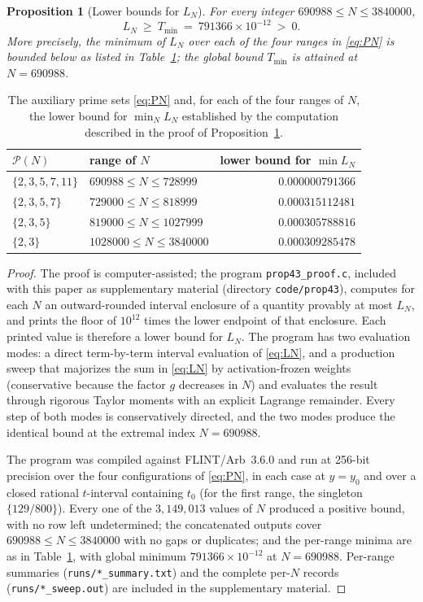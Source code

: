 \documentclass[11pt]{article}
\newtheorem{proposition}[theorem]{Proposition}
\theoremstyle{definition}
\newcommand{\calP}{\mathcal{P}}
\begin{document}
\begin{proposition}[Lower bounds for $L_N$]\label{prop:sweep}
For every integer $690988\le N\le3840000$,
\[
L_N\ \ge\ T_{\min}\ =\ 791366\times10^{-12}\ >\ 0 .
\]
More precisely, the minimum of $L_N$ over each of the four ranges in
\eqref{eq:PN} is bounded below as listed in
Table~\ref{tab:primesets}; the global bound $T_{\min}$ is attained
at $N=690988$.
\end{proposition}

\begin{table}[ht!]
\centering
\begin{tabular}{@{}llr@{}}
\toprule
$\calP(N)$ & range of $N$ & lower bound for $\min L_N$\\
\midrule
$\{2,3,5,7,11\}$ & $690988\le N\le728999$ & $0.000000791366$\\
$\{2,3,5,7\}$    & $729000\le N\le818999$ & $0.000315112481$\\
$\{2,3,5\}$      & $819000\le N\le1027999$ & $0.000305788816$\\
$\{2,3\}$        & $1028000\le N\le3840000$ & $0.000309285478$\\
\bottomrule
\end{tabular}
\caption{The auxiliary prime sets \eqref{eq:PN} and, for each of the
four ranges of $N$, the lower bound for $\min_N L_N$
established by the computation described in the proof of
Proposition~\ref{prop:sweep}.}
\label{tab:primesets}
\end{table}

\begin{proof}
The proof is computer-assisted;
the program \texttt{prop43\_proof.c}, included with
this paper as supplementary material (directory
\texttt{code/prop43}), computes for each $N$ an outward-rounded
interval enclosure of a quantity provably at most $L_N$, and prints
the floor of $10^{12}$ times the lower endpoint of that enclosure.
Each printed value is therefore a lower bound for $L_N$.
The program has
two evaluation modes: a direct term-by-term interval evaluation of
\eqref{eq:LN}, and a production sweep that majorizes the sum in
\eqref{eq:LN} by activation-frozen weights (conservative because the
factor $g$ decreases in $N$) and evaluates the result through
rigorous Taylor moments with an explicit Lagrange remainder. Every
step of both modes is conservatively directed, and the two modes
produce the identical bound at the extremal index $N=690988$.

The program was compiled against FLINT/Arb~3.6.0 and run at 256-bit
precision over the four
configurations of \eqref{eq:PN}, in each case at $y=y_0$ and over a
closed rational $t$-interval containing $t_0$ (for the first range,
the singleton $\{129/800\}$). Every one of the $3{,}149{,}013$
values of $N$ produced a positive bound, with no row left
undetermined; the concatenated outputs cover
$690988\le N\le3840000$ with no gaps or duplicates; and the
per-range minima are as in Table~\ref{tab:primesets}, with
global minimum $791366\times10^{-12}$ at $N=690988$. Per-range
summaries (\texttt{runs/*\_summary.txt}) and the complete per-$N$
records (\texttt{runs/*\_sweep.out}) are included in the
supplementary material.
\end{proof}
\end{document}
